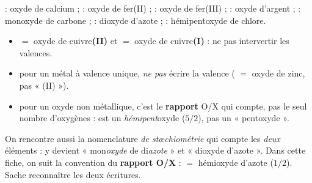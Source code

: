 \documentclass[11pt,a4paper]{article}
\begin{document}
\begin{exemplebox}
 : oxyde de calcium ;  : oxyde de fer(II) ;  : oxyde de fer(III) ;
 : oxyde d'argent ;  : monoxyde de carbone ;  : dioxyde d'azote ;
 : hémipentoxyde de chlore.
\end{exemplebox}

\begin{piege}
\begin{itemize}[leftmargin=1.4em,topsep=2pt,itemsep=1pt]
  \item {} $=$ oxyde de cuivre\textbf{(II)} et  $=$ oxyde de cuivre\textbf{(I)} :
        ne pas intervertir les valences.
  \item pour un métal à valence unique, \emph{ne pas} écrire la valence ( $=$ oxyde de zinc, pas « (II) »).
  \item pour un oxyde non métallique, c'est le \textbf{rapport} O/X qui compte, pas le seul nombre d'oxygènes :
         est un \emph{hémipent}oxyde ($5/2$), pas un « pentoxyde ».
\end{itemize}
\end{piege}

\begin{remarque}
On rencontre aussi la nomenclature \emph{de stœchiométrie} qui compte les \emph{deux} éléments :
 y devient « mon\emph{oxyde} de di\emph{azote} » et  « dioxyde d'azote ». Dans cette fiche,
on suit la convention du \textbf{rapport O/X} :  $=$ hémioxyde d'azote ($1/2$). Sache reconnaître les
deux écritures.
\end{remarque}
\end{document}
